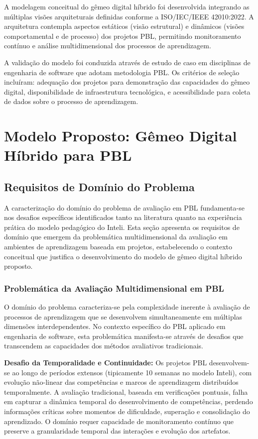 \documentclass[english, spanish, brazilian]{modelo_dt}
\begin{document}
A modelagem conceitual do gêmeo digital híbrido foi desenvolvida integrando as
múltiplas visões arquiteturais definidas conforme a ISO/IEC/IEEE 42010:2022\@. A arquitetura contempla aspectos estáticos (visão
estrutural) e dinâmicos (visões comportamental e de processo) dos projetos PBL,
permitindo monitoramento contínuo e análise multidimensional dos processos de
aprendizagem\@.

A validação do modelo foi conduzida através de estudo de caso em disciplinas de
engenharia de software que adotam metodologia PBL\@. Os critérios de seleção
incluíram: adequação dos projetos para demonstração das capacidades do gêmeo
digital, disponibilidade de infraestrutura tecnológica, e acessibilidade para
coleta de dados sobre o processo de aprendizagem\@.

\section{Modelo Proposto: Gêmeo Digital Híbrido para PBL}

\subsection{Requisitos de Domínio do Problema}

A caracterização do domínio do problema de avaliação em PBL fundamenta-se nos
desafios específicos identificados tanto na literatura quanto na experiência
prática do modelo pedagógico do Inteli. Esta seção apresenta os requisitos de
domínio que emergem da problemática multidimensional da avaliação em ambientes
de aprendizagem baseada em projetos, estabelecendo o contexto conceitual que
justifica o desenvolvimento do modelo de gêmeo digital híbrido proposto.

\subsubsection{Problemática da Avaliação Multidimensional em PBL}

O domínio do problema caracteriza-se pela complexidade inerente à avaliação de
processos de aprendizagem que se desenvolvem simultaneamente em múltiplas
dimensões interdependentes. No contexto específico do PBL aplicado em
engenharia de software, esta problemática manifesta-se através de desafios que
transcendem as capacidades dos métodos avaliativos tradicionais.

\textbf{Desafio da Temporalidade e Continuidade:} Os projetos PBL desenvolvem-se ao longo de períodos extensos (tipicamente 10 semanas no modelo Inteli), com evolução não-linear das competências e marcos de aprendizagem distribuídos temporalmente. A avaliação tradicional, baseada em verificações pontuais, falha em capturar a dinâmica temporal do desenvolvimento de competências, perdendo informações críticas sobre momentos de dificuldade, superação e consolidação do aprendizado. O domínio requer capacidade de monitoramento contínuo que preserve a granularidade temporal das interações e evolução dos artefatos.
\end{document}
